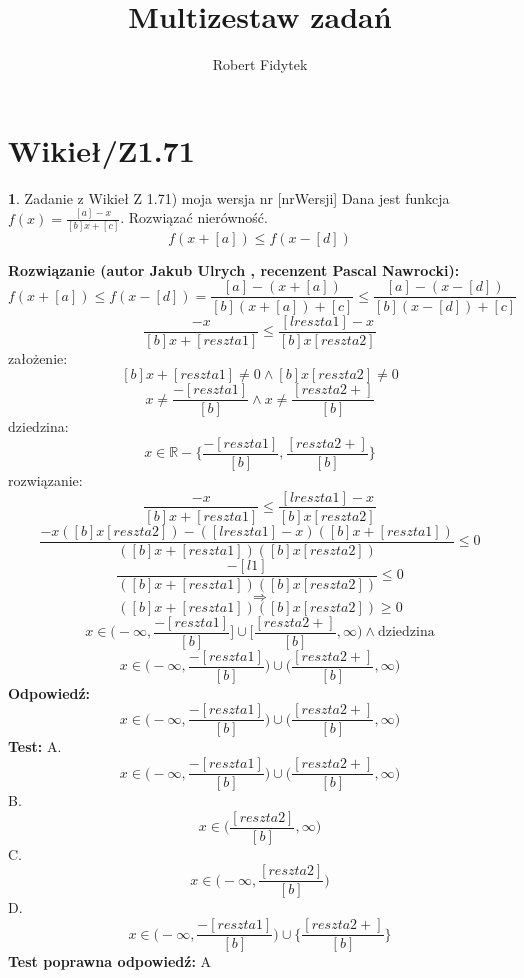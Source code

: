 \documentclass[12pt, a4paper]{article}
\title{Multizestaw zadań}
\author{Robert Fidytek}
\date{}
\theoremstyle{definition} %
\newtheorem{zad}{}
\newcommand{\kategoria}[1]{\section{#1}} %
\newcommand{\zadStart}[1]{\begin{zad}#1\newline} %
\newcommand{\zadStop}{\end{zad}}   %
\newcommand{\rozwStart}[2]{\noindent \textbf{Rozwiązanie (autor #1 , recenzent #2): }\newline} %
\newcommand{\rozwStop}{\newline}                                            %
\newcommand{\odpStart}{\noindent \textbf{Odpowiedź:}\newline}    %
\newcommand{\odpStop}{\newline}                                             %
\newcommand{\testStart}{\noindent \textbf{Test:}\newline} %
\newcommand{\testStop}{\newline} %
\newcommand{\kluczStart}{\noindent \textbf{Test poprawna odpowiedź:}\newline} %
\newcommand{\kluczStop}{\newline} %
\begin{document}
\maketitle


\kategoria{Wikieł/Z1.71}
\zadStart{Zadanie z Wikieł Z 1.71) moja wersja nr [nrWersji]}
Dana jest funkcja $f(x)=\frac{[a]-x}{[b]x+[c]}$. Rozwiązać nierówność.
$$f(x+[a])\leq f(x-[d])$$
\zadStop
\rozwStart{Jakub Ulrych}{Pascal Nawrocki}
$$f(x+[a])\leq f(x-[d])=\frac{[a]-(x+[a])}{[b](x+[a])+[c]}\leq\frac{[a]-(x-[d])}{[b](x-[d])+[c]}$$
$$\frac{-x}{[b]x+[reszta1]}\leq\frac{[lreszta1]-x}{[b]x[reszta2]}$$
założenie:$$[b]x+[reszta1]\neq0 \land [b]x[reszta2]\neq0$$
$$x\neq\frac{-[reszta1]}{[b]} \land x\neq\frac{[reszta2+]}{[b]}$$
dziedzina:$$x\in\mathbb{R}-\{\frac{-[reszta1]}{[b]},\frac{[reszta2+]}{[b]}\}$$
rozwiązanie:$$\frac{-x}{[b]x+[reszta1]}\leq\frac{[lreszta1]-x}{[b]x[reszta2]}$$
$$\frac{-x([b]x[reszta2])-([lreszta1]-x)([b]x+[reszta1])}{([b]x+[reszta1])([b]x[reszta2])}\leq0$$
$$\frac{-[l1]}{([b]x+[reszta1])([b]x[reszta2])}\leq0$$
$$\Rightarrow$$
$$([b]x+[reszta1])([b]x[reszta2])\geq0$$
$$x\in\bigg(-\infty,\frac{-[reszta1]}{[b]}\bigg]\cup\bigg[\frac{[reszta2+]}{[b]},\infty\bigg)\land\text{dziedzina}$$
$$x\in\bigg(-\infty,\frac{-[reszta1]}{[b]}\bigg)\cup\bigg(\frac{[reszta2+]}{[b]},\infty\bigg)$$
\rozwStop
\odpStart
$$x\in\bigg(-\infty,\frac{-[reszta1]}{[b]}\bigg)\cup\bigg(\frac{[reszta2+]}{[b]},\infty\bigg)$$
\odpStop
\testStart
A.$$x\in\bigg(-\infty,\frac{-[reszta1]}{[b]}\bigg)\cup\bigg(\frac{[reszta2+]}{[b]},\infty\bigg)$$
B.$$x\in\bigg(\frac{[reszta2]}{[b]},\infty\bigg)$$
C.$$x\in\bigg(-\infty,\frac{[reszta2]}{[b]}\bigg)$$
D.$$x\in\bigg(-\infty,\frac{-[reszta1]}{[b]}\bigg)\cup\bigg\{\frac{[reszta2+]}{[b]}\bigg\}$$
\testStop
\kluczStart
A
\kluczStop
\end{document}

